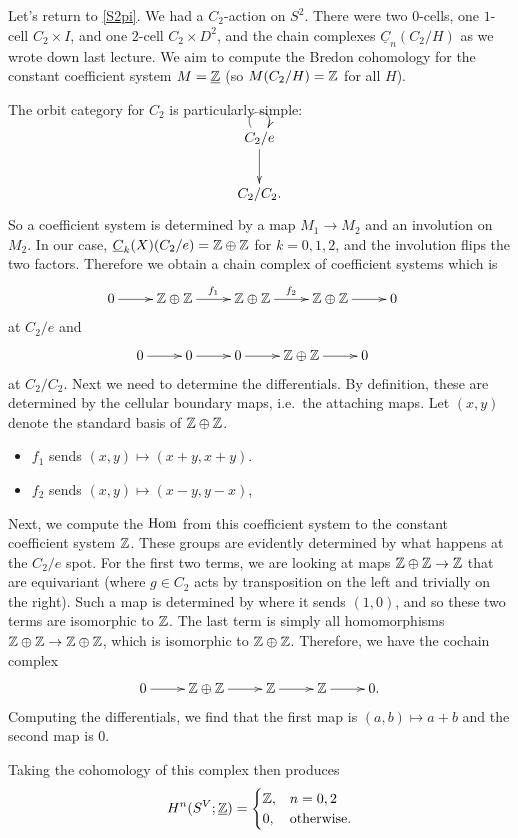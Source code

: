 \begin{exm}
Let's return to \cref{S2pi}. We had a $C_2$-action on $S^2$. There were two $0$-cells, one $1$-cell $C_2\times I$,
and one $2$-cell $C_2\times D^2$, and the chain complexes $\underline C_n(C_2/H)$ as we wrote down last lecture. We
aim to compute the Bredon cohomology for the constant coefficient system $M = \underline{\mathbb Z}$ (so $M(C_2/H) = \mathbb Z$ for
all $H$).

The orbit category for $C_2$ is particularly simple:
\[\xymatrix{
	C_2/e\ar[d]\ar@(ul, ur)\\
	C_2/C_2.
}\]
So a coefficient system is determined by a map $M_1\to M_2$ and an involution on $M_2$. In our case, $\underline
C_k(X)(C_2/e) = \mathbb Z\oplus\mathbb Z$ for $k = 0,1,2$, and the involution flips the two factors.  Therefore we obtain a chain complex of coefficient systems which is
\[
\shortexact[f_1][f_2]{\Z\oplus\Z}{\Z\oplus\Z}{\Z\oplus\Z}\quad
\]
at $C_2/e$ and
\[
\shortexact{0}{0}{\Z\oplus\Z}\quad
\]
at $C_2/C_2$.
Next we need to determine the differentials.  By definition, these are determined by the cellular boundary maps, i.e.\ the attaching maps. Let $(x,y)$ denote the standard basis of $\mathbb Z\oplus\mathbb Z$.
\begin{itemize}
	\item $f_1$ sends $(x,y)\mapsto (x+y, x+y)$.
	\item $f_2$ sends $(x,y)\mapsto (x-y, y-x)$, 
\end{itemize}

\iffalse
In terms of matrices, the differentials are given by
\[\xymatrix{
	0 \ar[r] & \Z\oplus\Z \ar[r]^-{\text{\tiny$\matr 1{-1}1{-1}$}} & \Z\oplus\Z \ar[r]^-{\text{\tiny$\matr 1{-1}{-1}1$}} & \Z\oplus\Z \ar[r] & 0
}\]
\fi

Next, we compute the $\operatorname{Hom}$ from this coefficient system to the constant coefficient system $\mathbb Z$.  These groups are evidently determined by what happens at the $C_2/e$ spot.  For the first two terms, we are looking at maps $\mathbb Z \oplus \mathbb Z \to \mathbb Z$ that are equivariant (where $g \in C_2$ acts by transposition on the left and trivially on the right).  Such a map is determined by where it sends $(1,0)$, and so these two terms are isomorphic to $\mathbb Z$.  The last term is simply all homomorphisms $\mathbb Z \oplus \mathbb Z \to \mathbb Z \oplus \mathbb Z$, which is isomorphic to $\mathbb Z \oplus \mathbb Z$.
Therefore, we have the cochain complex
\[
\shortexact{\Z \oplus \Z}{\Z}{\Z}.
\]
Computing the differentials, we find that the first map is $(a,b) \mapsto a+b$ and the second map is $0$.

Taking the cohomology of this complex then produces
\[H^n(S^V;\underline{\mathbb Z}) = \begin{cases}
	\mathbb Z, & n = 0, 2\\
	0, &\text{otherwise.}
\end{cases}\]
\end{exm}
